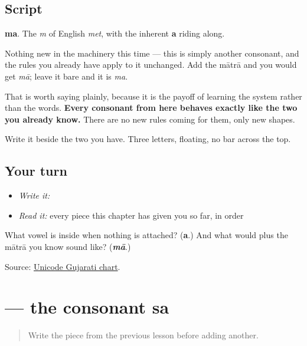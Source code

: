 \subsection*{Script}
\begin{quote}
\end{quote}

\textbf{ma}. The \emph{m} of English \emph{met}, with the inherent \textbf{a} riding along.

Nothing new in the machinery this time — this is simply another consonant, and the rules you already have apply to it unchanged. Add the mātrā and you would get \emph{mā}; leave it bare and it is \emph{ma}.

That is worth saying plainly, because it is the payoff of learning the system rather than the words. \textbf{Every consonant from here behaves exactly like the two you already know.} There are no new rules coming for them, only new shapes.

Write it beside the two you have. Three letters, floating, no bar across the top.

\subsection*{Your turn}
\begin{itemize}
\raggedright
  \item \emph{Write it:} 
  \item \emph{Read it:} every piece this chapter has given you so far, in order
\end{itemize}

\begin{tcolorbox}[breakable,colback=teal!4,colframe=teal!35!black,title={Before you move on}]
What vowel is inside \textbf{} when nothing is attached? (\textbf{a}.) And what would \textbf{} plus the mātrā you know sound like? (\emph{\textbf{mā}}.)

Source: \href{https://www.unicode.org/charts/PDF/U0A80.pdf}{Unicode Gujarati chart}.
\end{tcolorbox}
\section[sa]{ — the consonant sa}

\label{lesson:GU-W01-sa}



\begin{quote}
Write the piece from the previous lesson before adding another.
\end{quote}

